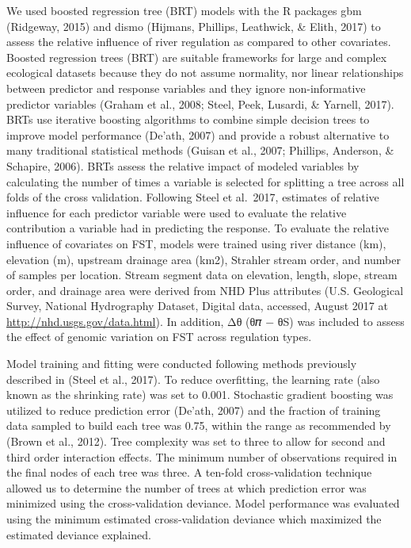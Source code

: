 \documentclass[twoside,12pt,final]{ucthesis-CA2012} %
\begin{document}
\begin{ucmainmatter}
We used boosted regression tree (BRT) models with the R packages gbm
(Ridgeway, 2015) and dismo (Hijmans, Phillips, Leathwick, \& Elith,
2017) to assess the relative influence of river regulation as compared
to other covariates. Boosted regression trees (BRT) are suitable
frameworks for large and complex ecological datasets because they do not
assume normality, nor linear relationships between predictor and
response variables and they ignore non-informative predictor variables
(Graham et al., 2008; Steel, Peek, Lusardi, \& Yarnell, 2017). BRTs use
iterative boosting algorithms to combine simple decision trees to
improve model performance (De'ath, 2007) and provide a robust
alternative to many traditional statistical methods (Guisan et al.,
2007; Phillips, Anderson, \& Schapire, 2006). BRTs assess the relative
impact of modeled variables by calculating the number of times a
variable is selected for splitting a tree across all folds of the cross
validation. Following Steel et al.~2017, estimates of relative influence
for each predictor variable were used to evaluate the relative
contribution a variable had in predicting the response. To evaluate the
relative influence of covariates on FST, models were trained using river
distance (km), elevation (m), upstream drainage area (km2), Strahler
stream order, and number of samples per location. Stream segment data on
elevation, length, slope, stream order, and drainage area were derived
from NHD Plus attributes (U.S. Geological Survey, National Hydrography
Dataset, Digital data, accessed, August 2017 at
\url{http://nhd.usgs.gov/data.html}). In addition, Δθ (θ𝜋 − θS) was
included to assess the effect of genomic variation on FST across
regulation types.

Model training and fitting were conducted following methods previously
described in (Steel et al., 2017). To reduce overfitting, the learning
rate (also known as the shrinking rate) was set to 0.001. Stochastic
gradient boosting was utilized to reduce prediction error (De'ath, 2007)
and the fraction of training data sampled to build each tree was 0.75,
within the range as recommended by (Brown et al., 2012). Tree complexity
was set to three to allow for second and third order interaction
effects. The minimum number of observations required in the final nodes
of each tree was three. A ten-fold cross-validation technique allowed us
to determine the number of trees at which prediction error was minimized
using the cross-validation deviance. Model performance was evaluated
using the minimum estimated cross-validation deviance which maximized
the estimated deviance explained.


\end{ucmainmatter}
\end{document}
